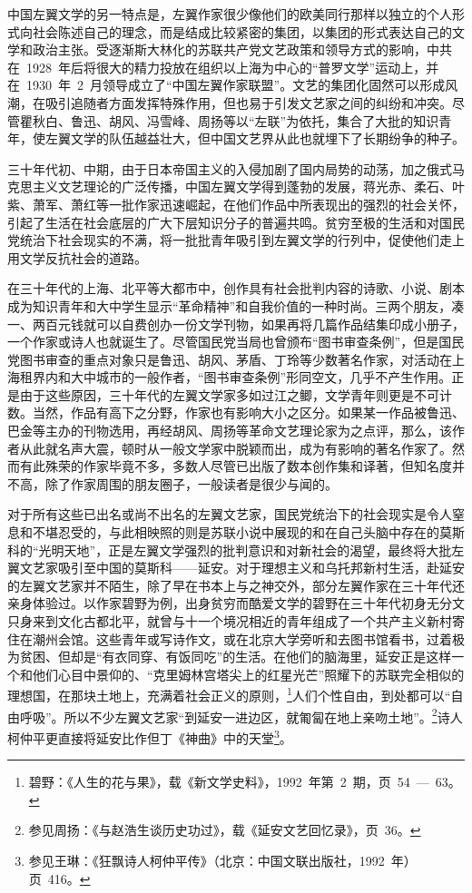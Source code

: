 中国左翼文学的另一特点是，左翼作家很少像他们的欧美同行那样以独立的个人形式向社会陈述自己的理念，而是结成比较紧密的集团，以集团的形式表达自己的文学和政治主张。受逐渐斯大林化的苏联共产党文艺政策和领导方式的影响，中共在~1928~年后将很大的精力投放在组织以上海为中心的“普罗文学”运动上，并在~1930~年~2~月领导成立了“中国左翼作家联盟”。文艺的集团化固然可以形成风潮，在吸引追随者方面发挥特殊作用，但也易于引发文艺家之间的纠纷和冲突。尽管瞿秋白、鲁迅、胡风、冯雪峰、周扬等以“左联”为依托，集合了大批的知识青年，使左翼文学的队伍越益壮大，但中国文艺界从此也就埋下了长期纷争的种子。

三十年代初、中期，由于日本帝国主义的入侵加剧了国内局势的动荡，加之俄式马克思主义文艺理论的广泛传播，中国左翼文学得到蓬勃的发展，蒋光赤、柔石、叶紫、萧军、萧红等一批作家迅速崛起，在他们作品中所表现出的强烈的社会关怀，引起了生活在社会底层的广大下层知识分子的普遍共鸣。贫穷至极的生活和对国民党统治下社会现实的不满，将一批批青年吸引到左翼文学的行列中，促使他们走上用文学反抗社会的道路。

在三十年代的上海、北平等大都市中，创作具有社会批判内容的诗歌、小说、剧本成为知识青年和大中学生显示“革命精神”和自我价值的一种时尚。三两个朋友，凑一、两百元钱就可以自费创办一份文学刊物，如果再将几篇作品结集印成小册子，一个作家或诗人也就诞生了。尽管国民党当局也曾颁布“图书审查条例”，但是国民党图书审查的重点对象只是鲁迅、胡风、茅盾、丁玲等少数著名作家，对活动在上海租界内和大中城市的一般作者，“图书审查条例”形同空文，几乎不产生作用。正是由于这些原因，三十年代的左翼文学家多如过江之鲫，文学青年则更是不可计数。当然，作品有高下之分野，作家也有影响大小之区分。如果某一作品被鲁迅、巴金等主办的刊物选用，再经胡风、周扬等革命文艺理论家为之点评，那么，该作者从此就名声大震，顿时从一般文学家中脱颖而出，成为有影响的著名作家了。然而有此殊荣的作家毕竟不多，多数人尽管已出版了数本创作集和译著，但知名度并不高，除了作家周围的朋友圈子，一般读者是很少与闻的。

对于所有这些已出名或尚不出名的左翼文艺家，国民党统治下的社会现实是令人窒息和不堪忍受的，与此相映照的则是苏联小说中展现的和在自己头脑中存在的莫斯科的“光明天地”，正是左翼文学强烈的批判意识和对新社会的渴望，最终将大批左翼文艺家吸引至中国的莫斯科——延安。对于理想主义和乌托邦新村生活，赴延安的左翼文艺家并不陌生，除了早在书本上与之神交外，部分左翼作家在三十年代还亲身体验过。以作家碧野为例，出身贫穷而酷爱文学的碧野在三十年代初身无分文只身来到文化古都北平，就曾与十一个境况相近的青年组成了一个共产主义新村寄住在潮州会馆。这些青年或写诗作文，或在北京大学旁听和去图书馆看书，过着极为贫困、但却是“有衣同穿、有饭同吃”的生活。在他们的脑海里，延安正是这样一个和他们心目中景仰的、“克里姆林宫塔尖上的红星光芒”照耀下的苏联完全相似的理想国，在那块土地上，充满着社会正义的原则，\footnote{碧野：《人生的花与果》，载《新文学史料》，1992~年第~2~期，页~54~—~63。}人们个性自由，到处都可以“自由呼吸”。所以不少左翼文艺家“到延安一进边区，就匍匐在地上亲吻土地”。\footnote{参见周扬：《与赵浩生谈历史功过》，载《延安文艺回忆录》，页~36。}诗人柯仲平更直接将延安比作但丁《神曲》中的天堂\footnote{参见王琳：《狂飘诗人柯仲平传》（北京：中国文联出版社，1992~年）页~416。}。

